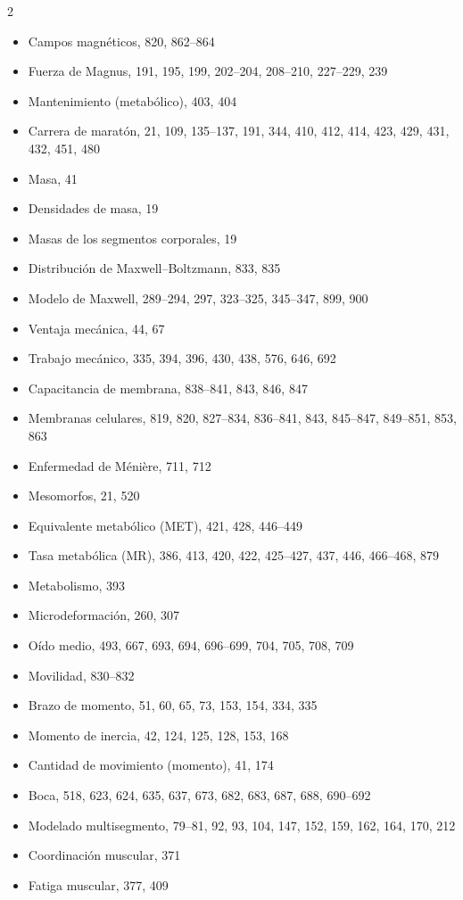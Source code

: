 \documentclass[12pt,a4paper]{book}
\begin{document}
\begin{multicols}{2}
\begin{itemize}[leftmargin=*]
  \item Campos magnéticos, 820, 862--864
  \item Fuerza de Magnus, 191, 195, 199, 202--204, 208--210, 227--229, 239
  \item Mantenimiento (metabólico), 403, 404
  \item Carrera de maratón, 21, 109, 135--137, 191, 344, 410, 412, 414, 423, 429, 431, 432, 451, 480
  \item Masa, 41
  \item Densidades de masa, 19
  \item Masas de los segmentos corporales, 19
  \item Distribución de Maxwell--Boltzmann, 833, 835
  \item Modelo de Maxwell, 289--294, 297, 323--325, 345--347, 899, 900
  \item Ventaja mecánica, 44, 67
  \item Trabajo mecánico, 335, 394, 396, 430, 438, 576, 646, 692
  \item Capacitancia de membrana, 838--841, 843, 846, 847
  \item Membranas celulares, 819, 820, 827--834, 836--841, 843, 845--847, 849--851, 853, 863
  \item Enfermedad de Ménière, 711, 712
  \item Mesomorfos, 21, 520
  \item Equivalente metabólico (MET), 421, 428, 446--449
  \item Tasa metabólica (MR), 386, 413, 420, 422, 425--427, 437, 446, 466--468, 879
  \item Metabolismo, 393
  \item Microdeformación, 260, 307
  \item Oído medio, 493, 667, 693, 694, 696--699, 704, 705, 708, 709
  \item Movilidad, 830--832
  \item Brazo de momento, 51, 60, 65, 73, 153, 154, 334, 335
  \item Momento de inercia, 42, 124, 125, 128, 153, 168
  \item Cantidad de movimiento (momento), 41, 174
  \item Boca, 518, 623, 624, 635, 637, 673, 682, 683, 687, 688, 690--692
  \item Modelado multisegmento, 79--81, 92, 93, 104, 147, 152, 159, 162, 164, 170, 212
  \item Coordinación muscular, 371
  \item Fatiga muscular, 377, 409

\end{itemize}
\end{multicols}
\end{document}
